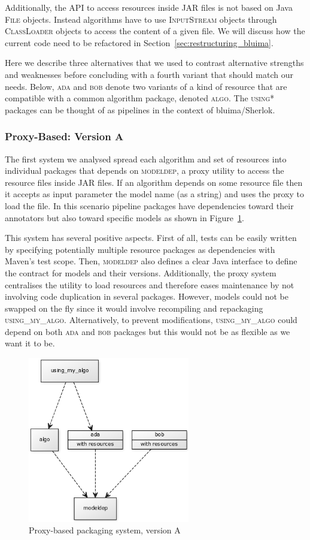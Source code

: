 \documentclass{article}
\newcommand{\ID}[1]{{\textsc{#1}}}
\newcommand{\JAR}{JAR\xspace}
\begin{document}
\begin{appendices}
Additionally, the API to access resources inside \JAR files is not based on Java \ID{File} objects.
Instead algorithms have to use \ID{InputStream} objects through \ID{ClassLoader} objects to access
the content of a given file. We will discuss how the current code need to be refactored in
Section~\ref{sec:restructuring_bluima}.

Here we describe three alternatives that we used to contrast alternative strengths and weaknesses
before concluding with a fourth variant that should match our needs. Below, \ID{ada} and \ID{bob}
denote two variants of a kind of resource that are compatible with a common algorithm package,
denoted \ID{algo}. The \ID{using*} packages can be thought of as pipelines in the context of
bluima/Sherlok.

\subsubsection{Proxy-Based: Version A}

The first system we analysed spread each algorithm and set of resources into individual packages
that depends on \ID{modeldep}, a proxy utility to access the resource files inside \JAR files. If an
algorithm depends on some resource file then it accepts as input parameter the model name (as a
string) and uses the proxy to load the file. In this scenario pipeline packages have dependencies
toward their annotators but also toward specific models as shown in Figure~\ref{fig:pkgsysA}.

This system has several positive aspects. First of all, tests can be easily written by specifying
potentially multiple resource packages as dependencies with Maven's test scope. Then, \ID{modeldep}
also defines a clear Java interface to define the contract for models and their versions.
Additionally, the proxy system centralises the utility to load resources and therefore eases
maintenance by not involving code duplication in several packages. However, models could not be
swapped on the fly since it would involve recompiling and repackaging \ID{using\_my\_algo}.
Alternatively, to prevent modifications, \ID{using\_my\_algo} could depend on both \ID{ada} and
\ID{bob} packages but this would not be as flexible as we want it to be.

\begin{figure}
    \centering
    \includegraphics[width=200pt]{res/packaging_version_A.png}
    \caption{Proxy-based packaging system, version A}
    \label{fig:pkgsysA}
\end{figure}



\end{appendices}
\end{document}
